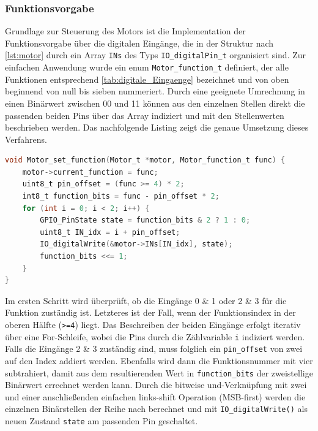 \subsubsection{Funktionsvorgabe}
Grundlage zur Steuerung des Motors ist die Implementation der Funktionsvorgabe über die digitalen Eingänge, die in der Struktur nach \autoref{lst:motor} durch ein Array \verb|INs| des Typs \verb|IO_digitalPin_t| organisiert sind. Zur einfachen Anwendung wurde ein enum \verb|Motor_function_t| definiert, der alle Funktionen entsprechend \autoref{tab:digitale_Eingaenge} bezeichnet und von oben beginnend von null bis sieben nummeriert. Durch eine geeignete Umrechnung in einen Binärwert zwischen 00 und 11 können aus den einzelnen Stellen direkt die passenden beiden Pins über das Array indiziert und mit den Stellenwerten beschrieben werden. Das nachfolgende Listing zeigt die genaue Umsetzung dieses Verfahrens.
\begin{lstlisting}[language=C, caption={Einstellung der Motorfunktionen}, label={lst:motorFunction}]
void Motor_set_function(Motor_t *motor, Motor_function_t func) {
	motor->current_function = func;
	uint8_t pin_offset = (func >= 4) * 2;
	int8_t function_bits = func - pin_offset * 2;
	for (int i = 0; i < 2; i++) {
		GPIO_PinState state = function_bits & 2 ? 1 : 0;
		uint8_t IN_idx = i + pin_offset;
		IO_digitalWrite(&motor->INs[IN_idx], state);
		function_bits <<= 1;
	}
}
\end{lstlisting}
Im ersten Schritt wird überprüft, ob die Eingänge 0 \& 1 oder 2 \& 3 für die Funktion zuständig ist. Letzteres ist der Fall, wenn der Funktionsindex in der oberen Hälfte (\verb|>=4|) liegt. Das Beschreiben der beiden Eingänge erfolgt iterativ über eine For-Schleife, wobei die Pins durch die Zählvariable \verb|i| indiziert werden. Falls die Eingänge 2 \& 3 zuständig sind, muss folglich ein \verb|pin_offset| von zwei auf den Index addiert werden. Ebenfalls wird dann die Funktionsnummer mit vier subtrahiert, damit aus dem resultierenden Wert in \verb|function_bits| der zweistellige Binärwert errechnet werden kann.
Durch die bitweise und-Verknüpfung mit zwei und einer anschließenden einfachen links-shift Operation (\acs{MSB}-first) werden die einzelnen Binärstellen der Reihe nach berechnet und mit \verb|IO_digitalWrite()| als neuen Zustand \verb|state| am passenden Pin geschaltet.
